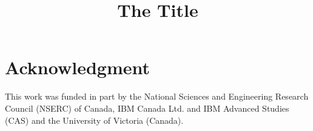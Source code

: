 \documentclass[conference]{IEEEtran}
\begin{document}

\title{The Title}

\author{
}

\makeatletter
{}
\makeatother

\maketitle

\begin{abstract}
\end{abstract}

\begin{IEEEkeywords}
\end{IEEEkeywords}




\section*{Acknowledgment}
This work was funded in part by the National Sciences and Engineering Research Council (NSERC) of Canada, IBM Canada Ltd. and IBM Advanced Studies (CAS) and the University of Victoria (Canada).




\end{document}
